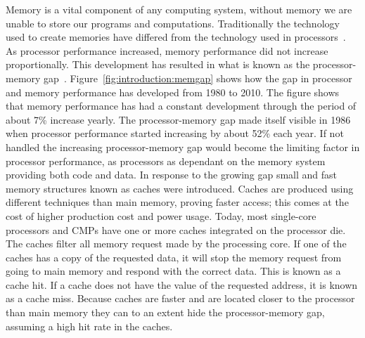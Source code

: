 Memory is a vital component of any computing system, without memory we are unable to store our programs and computations.
Traditionally the technology used to create memories have differed from the technology used in processors~\cite{Wilkes2001}.
As processor performance increased, memory performance did not increase proportionally.
This development has resulted in what is known as the processor-memory gap~\cite{Wilkes2001}.
Figure~\ref{fig:introduction:memgap} shows how the gap in processor and memory performance has developed from 1980 to 2010.
The figure shows that memory performance has had a constant development through the period of about 7\% increase yearly.
The processor-memory gap made itself visible in 1986 when processor performance started increasing by about 52\% each year.
If not handled the increasing processor-memory gap would become the limiting factor in processor performance, as processors as dependant on the memory system providing both code and data.
In response to the growing gap small and fast memory structures known as caches were introduced.
Caches are produced using different techniques than main memory, proving faster access; this comes at the cost of higher production cost and power usage.
Today, most single-core processors and CMPs have one or more caches integrated on the processor die.
The caches filter all memory request made by the processing core.
If one of the caches has a copy of the requested data, it will stop the memory request from going to main memory and respond with the correct data.
This is known as a cache hit.
If a cache does not have the value of the requested address, it is known as a cache miss.
Because caches are faster and are located closer to the processor than main memory they can to an extent hide the processor-memory gap, assuming a high hit rate in the caches.

